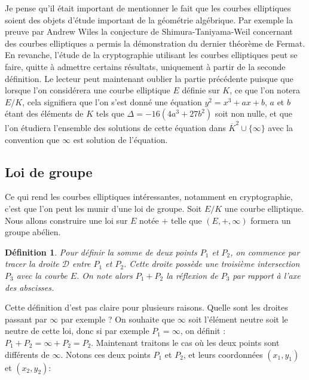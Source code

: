 \documentclass{article}
\theoremstyle{plain}%
\newtheorem{deff}[thm]{Définition}
\theoremstyle{definition}%
\newcommand{\ol}{\overline}
\begin{document}
Je pense qu'il était important de mentionner le fait que les courbes elliptiques soient des objets d'étude important de la géométrie algébrique. Par exemple la preuve par Andrew Wiles la conjecture de Shimura-Taniyama-Weil concernant des courbes elliptiques a permis la démonstration du dernier théorème de Fermat. En revanche, l'étude de la cryptographie utilisant les courbes elliptiques peut se faire, quitte à admettre certains résultats, uniquement à partir de la seconde définition. 
Le lecteur peut maintenant oublier la partie précédente puisque que lorsque l'on considérera une courbe elliptique $E$ définie sur $K$, ce que l'on notera $E/K$, cela signifiera que l'on s'est donné une équation $y^2 = x^3 + ax + b$, $a$ et $b$ étant des éléments de $K$ tels que $\Delta =-16(4a^3+ 27b^2)$ soit non nulle, et que l'on étudiera l'ensemble des solutions de cette équation dans $\ol K^2\cup \{\infty\}$ avec la convention que $\infty$ est solution de l'équation.


\subsection{Loi de groupe}

Ce qui rend les courbes elliptiques intéressantes, notamment en cryptographie, c'est que l'on peut les munir d'une loi de groupe. Soit $E/K$ une courbe elliptique. Nous allons construire une loi sur $E$ notée $+$ telle que $(E, +, \infty)$ formera un groupe abélien.

\begin{deff}
Pour définir la somme de deux points $P_1$ et $P_2$, on commence par tracer la droite $\mathcal D$ entre $P_1$ et $P_2$. Cette droite possède une troisième intersection $P_3$ avec la courbe $E$. On note alors $P_1 + P_2$ la réflexion de $P_3$ par rapport à l'axe des abscisses.
\end{deff}

Cette définition d'est pas claire pour plusieurs raisons. Quelle sont les  droites passant par $\infty$ par exemple ? On souhaite que $\infty$ soit l'élément neutre soit le neutre de cette loi, donc si par exemple $P_1=\infty$, on définit : $P_1+P_2 = \infty+P_2 = P_2$.
Maintenant traitons le cas où les deux points sont différents de $\infty$. Notons ces deux points $P_1$ et $P_2$, et leurs coordonnées $(x_1, y_1)$ et $(x_2, y_2)$:
\end{document}
